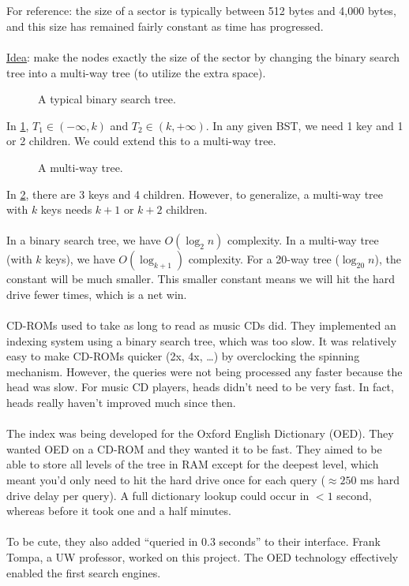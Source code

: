 \documentclass[]{article}
\theoremstyle{definition}
\begin{document}
			\\ \\
			For reference: the size of a sector is typically between 512 bytes and 4,000 bytes, and this size has remained fairly constant as time has progressed.
			\\ \\
			\underline{Idea}: make the nodes exactly the size of the sector by changing the binary search tree into a multi-way tree (to utilize the extra space).
			\begin{figure}[H]
				\caption{A typical binary search tree. \label{figure:typicalbst}}
			\end{figure}

			In \ref{figure:typicalbst}, $T_1 \in (- \infty, k)$ and $T_2 \in (k, +\infty)$. In any given BST, we need 1 key and 1 or 2 children. We could extend this to a multi-way tree.
			\begin{figure}[H]
				\caption{A multi-way tree. \label{figure:typicalmultiwaytree}}
			\end{figure}

			In \ref{figure:typicalmultiwaytree}, there are 3 keys and 4 children. However, to generalize, a multi-way tree with $k$ keys needs $k + 1$ or $k + 2$ children.
			\\ \\
			In a binary search tree, we have $O(\log_2 n)$ complexity. In a multi-way tree (with $k$ keys), we have $O(\log_{k + 1})$ complexity. For a 20-way tree ($\log_{20} n$), the constant will be much smaller. This smaller constant means we will hit the hard drive fewer times, which is a net win.
			\\ \\
			CD-ROMs used to take as long to read as music CDs did. They implemented an indexing system using a binary search tree, which was too slow. It was relatively easy to make CD-ROMs quicker (2x, 4x, \ldots) by overclocking the spinning mechanism. However, the queries were not being processed any faster because the head was slow. For music CD players, heads didn't need to be very fast. In fact, heads really haven't improved much since then.
			\\ \\
			The index was being developed for the Oxford English Dictionary (OED). They wanted OED on a CD-ROM and they wanted it to be fast. They aimed to be able to store all levels of the tree in RAM except for the deepest level, which meant you'd only need to hit the hard drive once for each query ($\approx 250$ ms hard drive delay per query). A full dictionary lookup could occur in $< 1$ second, whereas before it took one and a half minutes.
			\\ \\
			To be cute, they also added ``queried in 0.3 seconds'' to their interface. Frank Tompa, a UW professor, worked on this project. The OED technology effectively enabled the first search engines.
\end{document}
